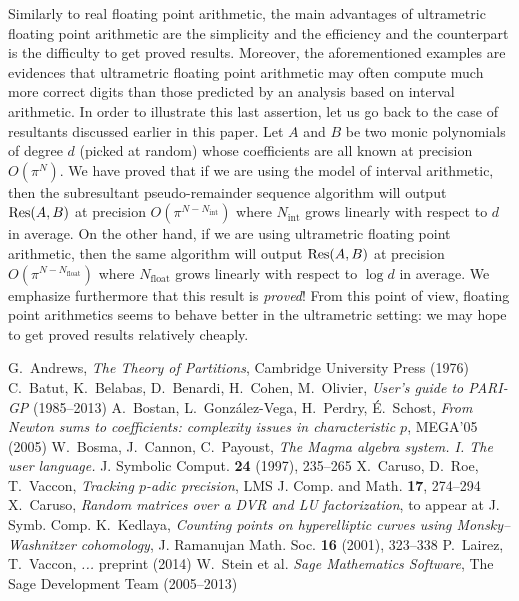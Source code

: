 \documentclass{sig-alternate}
\begin{document}
Similarly to real floating point arithmetic, the main advantages of 
ultrametric floating point arithmetic are the simplicity and the 
efficiency and the counterpart is the difficulty to get proved results. 
Moreover, the aforementioned examples are evidences that ultrametric 
floating point arithmetic may often compute much more correct digits 
than those predicted by an analysis based on interval arithmetic. In 
order to illustrate this last assertion, let us go back to the case of 
resultants discussed earlier in this paper. Let $A$ and $B$ be two monic 
polynomials of degree $d$ (picked at random) whose coefficients are all 
known at precision $O(\pi^N)$. We have proved that if we are using the
model of interval arithmetic, then the subresultant pseudo-remainder
sequence algorithm will output $\text{\rm Res}(A,B)$ at precision 
$O(\pi^{N-N_{\text{int}}})$ where $N_{\text{int}}$ grows linearly 
with respect to $d$ in average. On the other hand, if we are using 
ultrametric floating point arithmetic, then the same algorithm will
output $\text{\rm Res}(A,B)$ at precision $O(\pi^{N-N_{\text{float}}})$ where 
$N_{\text{float}}$ grows linearly with respect to $\log d$ in average.
We emphasize furthermore that this result is \emph{proved}! From this
point of view, floating point arithmetics seems to behave better in
the ultrametric setting: we may hope to get proved results relatively
cheaply.

\begin{thebibliography}{99}
  G.~Andrews,
  \emph{The Theory of Partitions},
  Cambridge University Press (1976)
  C.~Batut, K.~Belabas, D.~Benardi, H.~Cohen, M.~Olivier, 
  \emph{User’s guide to PARI-GP} (1985--2013)
  A.~Bostan, L.~Gonz\'alez-Vega, H.~Perdry, É.~Schost, 
  \emph{From Newton sums to coefficients: complexity issues in characteristic $p$}, 
  MEGA’05 (2005)
  W.~Bosma, J.~Cannon, C.~Payoust, 
  \emph{The Magma algebra system. I. The user language.}
  J. Symbolic Comput. {\bf 24} (1997), 235--265
  X.~Caruso, D.~Roe, T.~Vaccon,
  \emph{Tracking $p$-adic precision},
  LMS J. Comp. and Math. {\bf 17}, 274--294
  X.~Caruso,
  \emph{Random matrices over a DVR and LU factorization},
  to appear at J. Symb. Comp.
  K.~Kedlaya,
  \emph{Counting points on hyperelliptic curves using Monsky--Washnitzer cohomology}, 
  J. Ramanujan Math. Soc. {\bf 16} (2001), 323--338
  P.~Lairez, T.~Vaccon,
  \emph{...}
  preprint (2014)
  W.~Stein et al.
  \emph{Sage Mathematics Software}, 
  The Sage Development Team (2005--2013)


\bibitem{}
\end{thebibliography}
\end{document}
